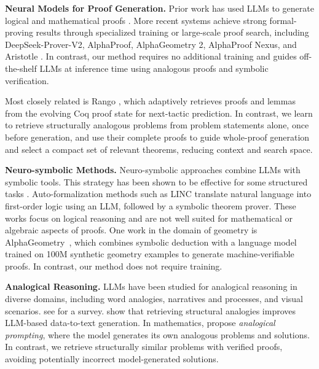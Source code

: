 


\noindent\textbf{Neural Models for Proof Generation.}
Prior work has used LLMs to generate logical and mathematical proofs \cite{tafjord2020proofwriter, kazemi2022lambada, yue2023mammoth}. More recent systems achieve strong formal-proving results through specialized training or large-scale proof search, including DeepSeek-Prover-V2, AlphaProof, AlphaGeometry 2, AlphaProof Nexus, and Aristotle \cite{ren2025deepseek, hubert2026olympiad, chervonyi2025gold, tsoukalas2026advancing, achim2025aristotle}. In contrast, our method requires no additional training and guides off-the-shelf LLMs at inference time using analogous proofs and symbolic verification.


Most closely related is Rango \cite{thompson2024rango}, which adaptively retrieves proofs and lemmas from the evolving Coq proof state for next-tactic prediction. In contrast, we learn to retrieve structurally analogous problems from problem statements alone, once before generation, and use their complete proofs to guide whole-proof generation and select a compact set of relevant theorems, reducing context and search space.

\noindent\textbf{Neuro-symbolic Methods.} Neuro-symbolic approaches combine LLMs with symbolic tools. This strategy has been shown to be effective for some structured tasks \cite{szeider2024mcp,regin2024combining,mittal2024puzzlebench,wu2024can}.
Auto-formalization methods \cite{song2024towards, alhessi2025lemmanaid} such as LINC \cite{olausson2023linc} translate natural language into first-order logic using an LLM, followed by a symbolic theorem prover. These works focus on logical reasoning and are not well suited for mathematical or algebraic aspects of proofs.
One work in the domain of geometry is AlphaGeometry~\cite{trinh2024solving}, which combines symbolic deduction with a language model trained on 100M synthetic geometry examples to generate machine-verifiable proofs. In contrast, our method does not require training.





 
\noindent\textbf{Analogical Reasoning.}   
LLMs have been studied for analogical reasoning in diverse domains, including word analogies, narratives and processes, and visual scenarios.
see \citet{sultan2024parallelparc} for a survey. \citet{jobanputra2024teamsaarlst} show that retrieving structural analogies improves LLM-based data-to-text generation. In mathematics, \citet{yasunaga2023large} propose \emph{analogical prompting}, where the model generates its own analogous problems and solutions. In contrast, we retrieve structurally similar problems with verified proofs, avoiding potentially incorrect model-generated solutions.


